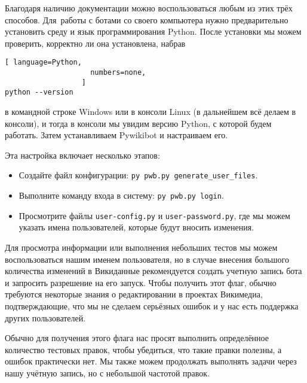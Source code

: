 Благодаря наличию документации 
можно воспользоваться любым из этих трёх способов. 
Для~работы с ботами со своего компьютера нужно предварительно установить среду и язык программирования Python. 
После установки мы можем проверить, 
корректно ли она установлена, 
набрав

\begin{lstlisting}[ language=Python,
                    numbers=none,
                  ]
python --version
\end{lstlisting}
в командной строке Windows или в консоли Linux (в дальнейшем всё делаем в консоли), 
и тогда в консоли мы увидим версию Python, с которой будем работать. Затем устанавливаем Pywikibot и настраиваем его. 

Эта настройка включает несколько этапов:
\begin{itemize}
  \item Создайте файл конфигурации: \lstinline|py pwb.py generate_user_files|.
  \item Выполните команду входа в систему: \lstinline|py pwb.py login|.
  \item Просмотрите файлы \lstinline|user-config.py| и \lstinline|user-password.py|, где мы можем указать имена пользователей, которые будут вносить изменения.
\end{itemize}

Для просмотра информации или выполнения небольших тестов 
мы можем воспользоваться нашим именем пользователя, 
%
но в случае внесения большого количества изменений в Викиданные рекомендуется создать учетную запись бота и запросить разрешение на его запуск. Чтобы получить этот флаг, обычно требуются некоторые знания о редактировании в проектах Викимедиа, подтверждающие, что мы не сделаем серьёзных ошибок и у нас есть поддержка других пользователей.

Обычно для получения этого флага нас просят выполнить определённое количество тестовых правок, 
чтобы убедиться, что такие правки полезны, а ошибок практически нет. 
Мы также можем продолжать выполнять задачи через нашу учётную запись, но с небольшой частотой правок.


